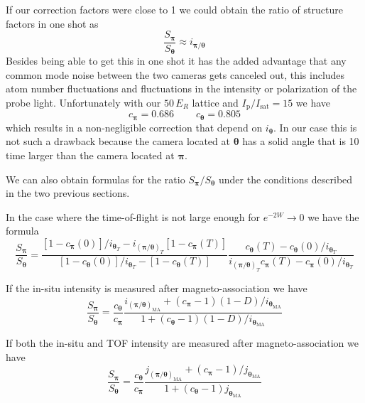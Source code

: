 \documentclass[11pt,letter]{article}
\newcommand{\bv}[1]{\ensuremath{\bm{#1}}}
\newcommand{\iisat}{\ensuremath{I_{\mathrm{p}}/I_{\mathrm{sat}}}}
\newcommand{\ipith}{\ensuremath{i_{\bv{\pi}/\bv{\theta}}}}
\newcommand{\iT}[1]{\ensuremath{i_{\bv{#1}_{T}} }}
\newcommand{\ima}[1]{\ensuremath{i_{\bv{#1}_{\text{MA}}} }}
\newcommand{\jma}[1]{\ensuremath{j_{\bv{#1}_{\text{MA}}} }}
\begin{document}
If our correction factors were close to 1 we could obtain the ratio of
structure factors in one shot as 
\begin{equation}
  \frac{ S_{\bv{\pi}} }{ S_{\bv{\theta}} } \approx \ipith
\end{equation}
Besides being able to get this in one shot it has the added advantage that any
common mode noise between the two cameras gets canceled out, this includes
atom number fluctuations and fluctuations in the intensity or polarization of
the probe light.  Unfortunately with our $50\,E_{R}$ lattice and $\iisat=15$ we
have 
\begin{equation}
  c_{\bv{\pi}} =  0.686
 \ \ \ \ \ \ \ \ \ \ 
  c_{\bv{\theta}} = 0.805 
\end{equation} 
which results in a non-negligible correction that depend on $i_{\bv{\theta}}$.
In our case this is not such a drawback because the camera located at
$\bv{\theta}$ has a solid angle that is 10 time larger than the camera located
at $\bv{\pi}$.  

We can also obtain formulas for the ratio $S_{\bv{\pi}}/S_{\bv{\theta}}$ under
the conditions described in the two previous sections.  

In the case where the time-of-flight is not large enough for
$e^{-2W}\rightarrow 0$ we have the formula
\begin{equation}
   \frac{ S_{\bv{\pi}}}{ S_{\bv{\theta}}} = 
   \frac{ [1-c_{\bv{\pi}}(0)]/ \iT{\theta}   
         - \iT{(\pi/\theta)} [1-c_{\bv{\pi}}(T) ] }
        {  [1-c_{\bv{\theta}}(0)]/\iT{\theta}  - [1-c_{\bv{\theta}}(T)]  }
   \frac{ c_{\bv{\theta}}(T) - c_{\bv{\theta}}(0)/ \iT{\theta}  } 
        { \iT{(\pi/\theta)}  c_{\bv{\pi}}(T) 
          - c_{\bv{\pi}}(0)/ \iT{\theta} } 
\end{equation}

If the in-situ intensity is measured after magneto-association we have 
\begin{equation}
   \frac{ S_{\bv{\pi}}}{ S_{\bv{\theta}}} = 
   \frac{ c_{\bv{\theta}} } { c_{\bv{\pi}} } 
   \frac{  \ima{(\pi/\theta)} 
               + (c_{\bv{\pi}} - 1 ) (1-D) / \ima{\theta} } 
        {   1 
               + (c_{\bv{\theta}} - 1 ) (1-D) / \ima{\theta} } 
\end{equation}

If both the in-situ and TOF intensity are measured after magneto-association we
have
\begin{equation}
    \frac{ S_{\bv{\pi}}}{ S_{\bv{\theta}}} = 
    \frac{ c_{\bv{\theta}} } { c_{\bv{\pi}} } 
    \frac{ \jma{(\pi/\theta)}  + (c_{\bv{\pi}} - 1 ) / \jma{\theta}  }
         { 1 +  (c_{\bv{\theta}} - 1 ) \jma{\theta} } 
\end{equation}
   
\end{document}
